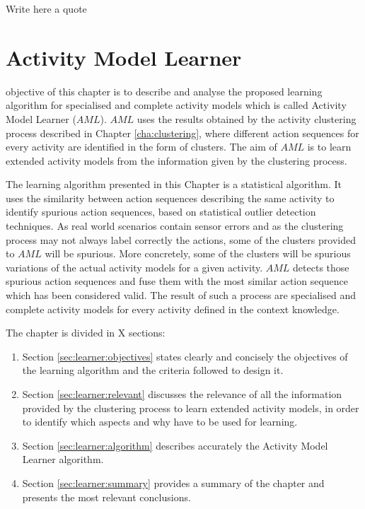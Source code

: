 

\begin{savequote}[50mm]
Write here a quote
\end{savequote}


\chapter{Activity Model Learner}
\label{cha:learner}

\ifpdf
    \graphicspath{{5_activity_model_learner/figures/PDF/}{5_activity_model_learner/figures/PNG/}{5_activity_model_learner/figures/}}
\else
    \graphicspath{{5_activity_model_learner/figures/EPS/}{5_activity_model_learner/figures/}}
\fi

 objective of this chapter is to describe and analyse the proposed learning algorithm for specialised and complete activity models which is called Activity Model Learner ($AML$). $AML$ uses the results obtained by the activity clustering process described in Chapter \ref{cha:clustering}, where different action sequences for every activity are identified in the form of clusters. The aim of $AML$ is to learn extended activity models from the information given by the clustering process.

The learning algorithm presented in this Chapter is a statistical algorithm. It uses the similarity between action sequences describing the same activity to identify spurious action sequences, based on statistical outlier detection techniques. As real world scenarios contain sensor errors and as the clustering process may not always label correctly the actions, some of the clusters provided to $AML$ will be spurious. More concretely, some of the clusters will be spurious variations of the actual activity models for a given activity. $AML$ detects those spurious action sequences and fuse them with the most similar action sequence which has been considered valid. The result of such a process are specialised and complete activity models for every activity defined in the context knowledge. 

The chapter is divided in X sections:

\begin{enumerate}
 \item Section \ref{sec:learner:objectives} states clearly and concisely the objectives of the learning algorithm and the criteria followed to design it.
 \item Section \ref{sec:learner:relevant} discusses the relevance of all the information provided by the clustering process to learn extended activity models, in order to identify which aspects and why have to be used for learning.
 \item Section \ref{sec:learner:algorithm} describes accurately the Activity Model Learner algorithm.
 \item Section \ref{sec:learner:summary} provides a summary of the chapter and presents the most relevant conclusions.
\end{enumerate}
